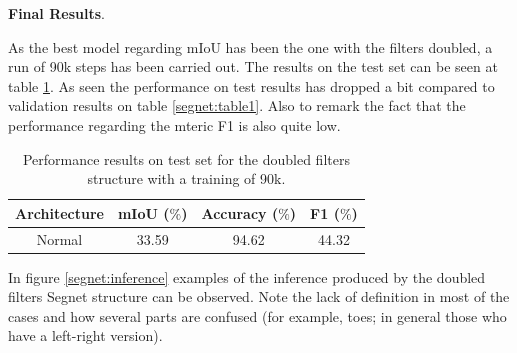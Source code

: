 \documentclass[12pt,a4paper]{article}
\begin{document}
\textbf{Final Results}. \newline

As the best model regarding mIoU has been the one with the filters doubled, a run of 90k steps has been carried out. The results on the test set can be seen at table \ref{segnet:table3}. As seen the performance on test results has dropped a bit compared to validation results on table \ref{segnet:table1}. Also to remark the fact that the performance regarding the mteric F1 is also quite low.\newline


\begin{table}[h!]
  \begin{center}
    
    \begin{tabular}{|c|c|c|c|} %
      \textbf{Architecture} & \textbf{mIoU ($\%$)} & \textbf{Accuracy ($\%$)} & \textbf{F1 ($\%$)} \\
      \hline
      Normal & 33.59 & 94.62 & 44.32\\
    \end{tabular}
    \caption{Performance results on test set for the doubled filters structure with a training of 90k.}
    \label{segnet:table3}
  \end{center}
\end{table}

In figure \ref{segnet:inference} examples of the inference produced by the doubled filters Segnet structure can be observed. Note the lack of definition in most of the cases and how several parts are confused (for example, toes; in general those who have a left-right version).\newline
\end{document}
